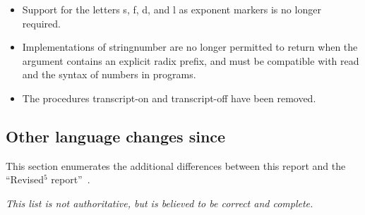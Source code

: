 \begin{itemize}
\item Support for the letters {\cf s}, {\cf f}, {\cf d}, and {\cf l}
as exponent markers is no longer required.

\item Implementations of {\cf string\coerce{}number} are no longer permitted
to return \schfalse{} when the argument contains an explicit radix prefix,
and must be compatible with {\cf read} and the syntax of numbers in programs.

\item The procedures {\cf transcript-on} and {\cf transcript-off} have been removed.

\end{itemize}

\subsection*{Other language changes since \rfivers}
\label{differences}
This section enumerates the additional differences between this report and
the ``Revised$^5$ report''~\cite{R5RS}.

{\em This list is not authoritative, but is believed to be correct and complete.}

